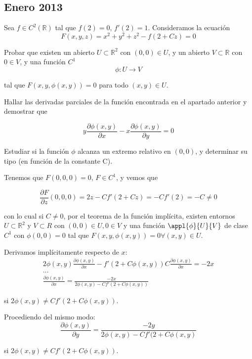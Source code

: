 \subsection{Enero 2013}
\begin{problem}[1]

Sea $f\in C^2(\mathbb{R})$ tal que $f(2) = 0$, $f'(2)=1$. Consideramos la ecuación \[ F(x,y,z) = x^2+y^2+z^2-f(2+Cz)=0 \]

\ppart Probar que existen un abierto $U\subset \mathbb{R}^2$ con $(0,0)\in U$, y un abierto $V\subset \mathbb{R}$ con $0\in V$, y una función $C^1$ \[ \phi: U \rightarrow V \]

tal que $F(x, y, \phi (x, y)) = 0$ para todo $(x,y) \in U$.

\ppart Hallar las derivadas parciales de la función encontrada en el apartado anterior y demostrar que 

\[ y\frac{\partial  \phi (x,y)}{\partial  x} - x\frac{\partial  \phi (x,y)}{\partial  y} = 0 \]

\ppart Estudiar si la función $\phi$ alcanza un extremo relativo en $(0,0)$, y determinar su tipo (en función de la constante C).

\solution

\spart Tenemos que $F(0,0,0) = 0$, $F∈C^1$, y vemos que 

\[ \frac{\partial  F}{\partial  z}(0,0,0) = 2z - Cf'(2+Cz)=-Cf'(2) = -C \neq 0 \]

con lo cual si $C \neq 0$, por el teorema de la función implícita, existen entornos $U\subset \mathbb{R}^2$ y $V\subset{R}$ con $(0,0)\in U, 0\in V$ y una función $\appl{\phi}{U}{V}$ de clase $C^1$ con $\phi (0,0) = 0$ tal que $F(x,y,\phi (x,y)) = 0 \forall (x,y)\in U$.

\spart 
Derivamos implícitamente respecto de $x$:
\begin{gather*}
2\phi (x,y) \frac{\partial  \phi (x,y)}{\partial  x} - f'(2+C\phi (x,y))C\frac{\partial  \phi (x,y)}{\partial  x}=-2x \\
\hdots \\
\frac{\partial  \phi (x,y)}{\partial  x} = \frac{-2x}{2\phi (x,y) - Cf'(2+C\phi (x,y))}
\end{gather*}

 si $2\phi (x,y) \neq Cf'(2+C\phi (x,y))$.

Procediendo del mismo modo: 
\[ \frac{\partial  \phi (x,y)}{\partial  y} = \frac{-2y}{2\phi (x,y) - Cf'(2+C\phi (x,y)} \] 

si $2\phi (x,y) \neq Cf'(2+C\phi (x,y))$.


\end{problem}
